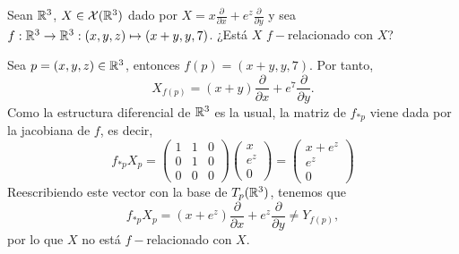 \documentclass[twoside]{article}
\begin{document}
\begin{ejercicio}{6}
Sean $\mathbb{R}^3$, $X \in \mathcal{X}(\mathbb{R}^3)$ dado por $X = x\frac{\partial}{\partial x} + e^z\frac{\partial}{\partial y}$ y sea $f :
\mathbb{R}^3 \to \mathbb{R}^3 : (x, y, z) \mapsto (x + y, y, 7)$. ¿Está $X$ $f-$relacionado con $X$?
\end{ejercicio}
\begin{solucion}
Sea $p=(x,y,z)\in\mathbb{R}^3$, entonces $f(p)=(x+y,y,7)$. Por tanto, $$X_{f(p)}=(x+y)\frac{\partial}{\partial x} + e^7\frac{\partial}{\partial y}.$$ %
Como la estructura diferencial de $\mathbb{R}^3$ es la usual, la matriz de $f_{*p}$ viene dada por la jacobiana de $f$, es decir, 
\[f_{*p}X_p=\begin{pmatrix}
1 & 1 & 0\\
0 & 1 & 0\\
0 & 0 & 0
\end{pmatrix}\begin{pmatrix}
x\\
e^z\\
0
\end{pmatrix}=\begin{pmatrix}
x+e^z\\
e^z\\
0
\end{pmatrix}\]
Reescribiendo este vector con la base de $T_p(\mathbb{R}^3)$, tenemos que 
$$f_{*p}X_p=(x+e^z)\frac{\partial}{\partial x} + e^z\frac{\partial}{\partial y}\neq Y_{f(p)},$$
por lo que $X$ no está $f-$relacionado con $X$.
\end{solucion}
\end{document}
